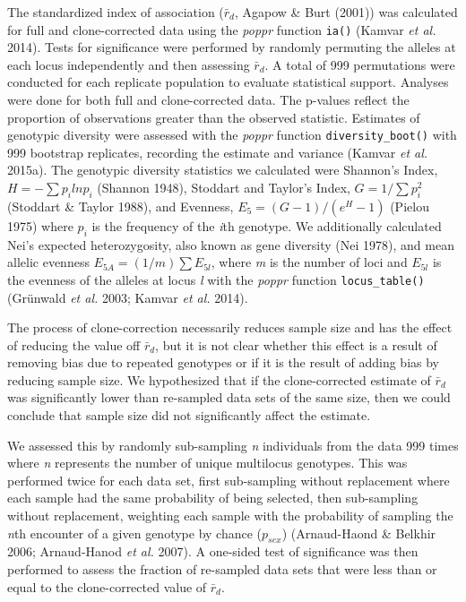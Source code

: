 \documentclass[]{article}
\theoremstyle{definition}
\theoremstyle{definition}
\theoremstyle{remark}
\begin{document}
The standardized index of association (\(\bar{r}_d\), Agapow \& Burt
(2001)) was calculated for full and clone-corrected data using the
\emph{poppr} function \texttt{ia()} (Kamvar \emph{et al.} 2014). Tests
for significance were performed by randomly permuting the alleles at
each locus independently and then assessing \(\bar{r}_d\). A total of
999 permutations were conducted for each replicate population to
evaluate statistical support. Analyses were done for both full and
clone-corrected data. The p-values reflect the proportion of
observations greater than the observed statistic. Estimates of genotypic
diversity were assessed with the \emph{poppr} function
\texttt{diversity\_boot()} with 999 bootstrap replicates, recording the
estimate and variance (Kamvar \emph{et al.} 2015a). The genotypic
diversity statistics we calculated were Shannon's Index,
\(H = -\sum p_i ln p_i\) (Shannon 1948), Stoddart and Taylor's Index,
\(G = 1/\sum p_i^2\) (Stoddart \& Taylor 1988), and Evenness,
\(E_5 = (G - 1)/(e^H - 1)\) (Pielou 1975) where \(p_i\) is the frequency
of the \emph{i}th genotype. We additionally calculated Nei's expected
heterozygosity, also known as gene diversity (Nei 1978), and mean
allelic evenness \(E_{5A} = (1/m) \sum E_{5l}\), where \emph{m} is the
number of loci and \(E_{5l}\) is the evenness of the alleles at locus
\emph{l} with the \emph{poppr} function \texttt{locus\_table()}
(Grünwald \emph{et al.} 2003; Kamvar \emph{et al.} 2014).

The process of clone-correction necessarily reduces sample size and has
the effect of reducing the value off \(\bar{r}_d\), but it is not clear
whether this effect is a result of removing bias due to repeated
genotypes or if it is the result of adding bias by reducing sample size.
We hypothesized that if the clone-corrected estimate of \(\bar{r}_d\)
was significantly lower than re-sampled data sets of the same size, then
we could conclude that sample size did not significantly affect the
estimate.

We assessed this by randomly sub-sampling \emph{n} individuals from the
data 999 times where \emph{n} represents the number of unique multilocus
genotypes. This was performed twice for each data set, first
sub-sampling without replacement where each sample had the same
probability of being selected, then sub-sampling without replacement,
weighting each sample with the probability of sampling the \emph{n}th
encounter of a given genotype by chance (\(p_{sex}\)) (Arnaud-Haond \&
Belkhir 2006; Arnaud-Hanod \emph{et al.} 2007). A one-sided test of
significance was then performed to assess the fraction of re-sampled
data sets that were less than or equal to the clone-corrected value of
\(\bar{r}_d\).
\end{document}
